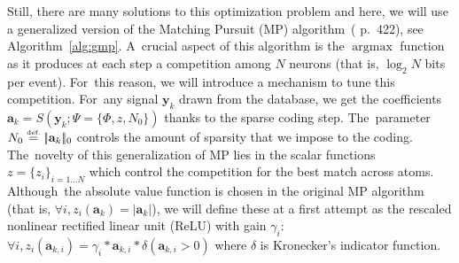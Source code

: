 \documentclass[vision,article,accept,oneauthor,pdftex]{Definitions/mdpi}
\DeclareMathOperator*{\ArgMax}{\arg\max}   %
\newcommand{\coef}{\mathbf{a}} %
\newcommand{\image}{\mathbf{y}} %
\newcommand{\dico}{\Phi} %
\newcommand{\norm}[1]{|\!| #1 |\!|}
\newcommand{\eqdef}{\ensuremath{\stackrel{\mbox{\upshape\tiny def.}}{=}}}
\begin{document}
Still, there are many solutions to this optimization problem and here, we will use a generalized version of the {\color{black}Matching} {\color{black}Pursuit} (MP) algorithm~(\cite{Mallat98} p.~422), see Algorithm~\ref{alg:gmp}. A~crucial aspect of this algorithm is the $\ArgMax$ function as it produces at each step a competition among $N$ neurons (that is, $\log_2 N$ bits per event). For~this reason, we will introduce a mechanism to tune this competition. For~any signal $\image_k$ drawn from the database, we get the coefficients $\coef_{k} = S(\image_k; \Psi=\{\dico, z, N_0\})$ thanks to the sparse coding step. The~parameter $N_0 \eqdef \norm{\coef_{k}}_0$ controls the amount of sparsity that we impose to the coding. The~novelty of this generalization of MP lies in the scalar functions $z = \{z_i \}_{i = 1 \ldots N }$ which control the competition for the best {\color{black}match} across atoms. Although~the absolute value function is chosen in the original MP algorithm (that is, $\forall i, z_i(\coef_{k}) = |\coef_{k}|$), we will define these at a first attempt as the rescaled nonlinear rectified linear unit (ReLU) with gain $\gamma_i$: $\forall i, z_i (\coef_{k,i}) = \gamma_i * \coef_{k,i} * \delta(\coef_{k,i}>0)$ where $\delta$ is Kronecker's indicator function.
\end{document}
